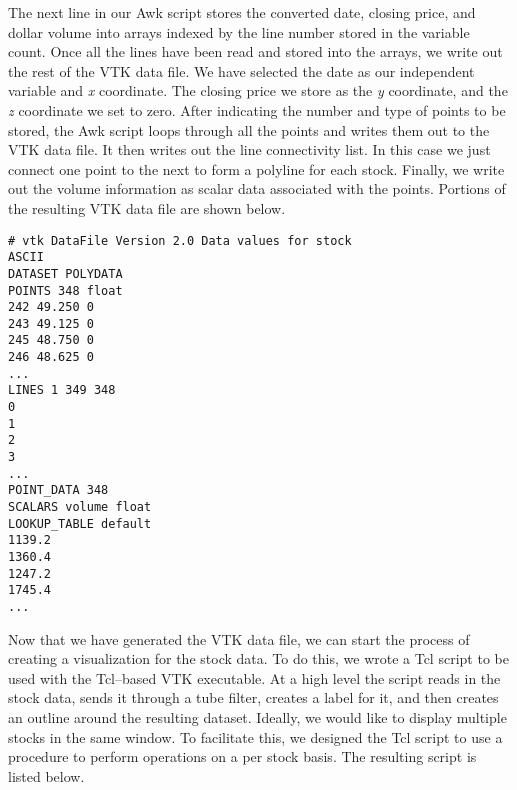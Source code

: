 The next line in our Awk script stores the converted date, closing price, and dollar volume  into arrays indexed by the line number stored in the variable count. Once all the lines have been read and stored into the arrays, we write out the rest of the VTK data file. We have selected the date as our independent variable and \emph{x} coordinate. The closing price we store as the \emph{y} coordinate, and the \emph{z} coordinate we set to zero. After indicating the number and type of points to be stored, the Awk script loops through all the points and writes them out to the VTK data file. It then writes out the line connectivity list. In this case we just connect one point to the next to form a polyline for each stock. Finally, we write out the volume information as scalar data associated with the points. Portions of the resulting VTK data file are shown below.

\begin{lstlisting}[numbers=none]
# vtk DataFile Version 2.0 Data values for stock
ASCII
DATASET POLYDATA
POINTS 348 float
242 49.250 0
243 49.125 0
245 48.750 0
246 48.625 0
...
LINES 1 349 348
0
1
2
3
...
POINT_DATA 348
SCALARS volume float
LOOKUP_TABLE default
1139.2
1360.4
1247.2
1745.4
...
\end{lstlisting}

Now that we have generated the VTK data file, we can start the process of creating a visualization for the stock data. To do this, we wrote a Tcl script to be used with the Tcl--based VTK executable. At a high level the script reads in the stock data, sends it through a tube filter, creates a label for it, and then creates an outline around the resulting dataset. Ideally, we would like to display multiple stocks in the same window. To facilitate this, we designed the Tcl script to use a procedure to perform operations on a per stock basis. The resulting script is listed below.


